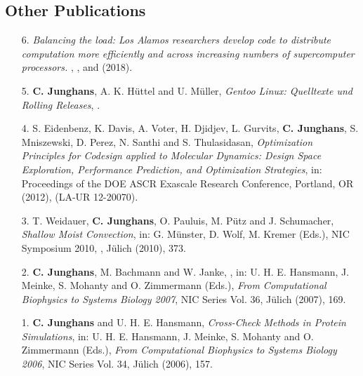 \documentclass{article}
\begin{document}
\subsection*{Other Publications}

\begin{enumerate}
\item[6.] \textit{Balancing the load: Los Alamos researchers develop code to distribute computation more efficiently and across increasing numbers of supercomputer processors.}
  , ,  and  (2018).

\item[5.] \textbf{C. Junghans}, A. K. H{\"u}ttel and U. M{\"u}ller, 
  \textit{Gentoo Linux: Quelltexte und Rolling Releases},
  .

\item[4.] S. Eidenbenz, K. Davis, A. Voter, H. Djidjev, L. Gurvits, \textbf{C. Junghans}, S. Mniszewski, D. Perez, N. Santhi and S. Thulasidasan,
  \textit{Optimization Principles for Codesign applied to Molecular Dynamics: Design Space Exploration, Performance Prediction, and Optimization Strategies},
  in: Proceedings of the DOE ASCR Exascale Research Conference, Portland, OR (2012), (LA-UR 12-20070). 

\item[3.] T. Weidauer, \textbf{C. Junghans}, O. Pauluis, M. P{\"u}tz and J. Schumacher,
  \textit{Shallow Moist Convection},
  in: G. M{\"u}nster, D. Wolf, M. Kremer (Eds.),
  NIC Symposium 2010, , J{\"u}lich (2010), 373.

\item[2.] \textbf{C. Junghans}, M. Bachmann and W. Janke,
  \textit{},
  in: U. H. E. Hansmann, J. Meinke, S. Mohanty and O. Zimmermann (Eds.),
  \textit{From Computational Biophysics to Systems Biology 2007}, NIC Series Vol. 36, J{\"u}lich (2007), 169.

\item[1.] \textbf{C. Junghans} and U. H. E. Hansmann,
  \textit{Cross-Check Methods in Protein Simulations},
  in: U. H. E. Hansmann, J. Meinke, S. Mohanty and O. Zimmermann (Eds.),
  \textit{From Computational Biophysics to Systems Biology 2006},
  NIC Series Vol. 34, J{\"u}lich (2006), 157.
\end{enumerate}
\end{document}
